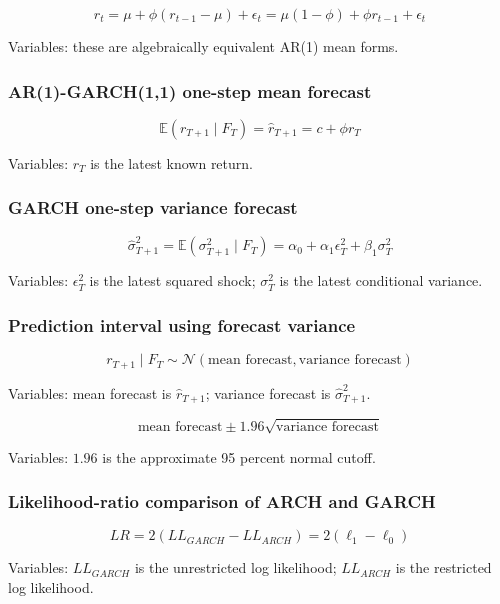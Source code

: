 \documentclass[
  8pt,
  twocolumn]{extarticle}
\begin{document}
\[
r_t=\mu+\phi(r_{t-1}-\mu)+\epsilon_t=\mu(1-\phi)+\phi r_{t-1}+\epsilon_t
\]

Variables: these are algebraically equivalent AR(1) mean forms.

\subsubsection{AR(1)-GARCH(1,1) one-step mean
forecast}\label{ar1-garch11-one-step-mean-forecast}

\[
\mathbb E(r_{T+1}\mid F_T)=\hat r_{T+1}=c+\phi r_T
\]

Variables: \(r_T\) is the latest known return.

\subsubsection{GARCH one-step variance
forecast}\label{garch-one-step-variance-forecast}

\[
\hat\sigma_{T+1}^2=\mathbb E(\sigma_{T+1}^2\mid F_T)=\alpha_0+\alpha_1\epsilon_T^2+\beta_1\sigma_T^2
\]

Variables: \(\epsilon_T^2\) is the latest squared shock; \(\sigma_T^2\)
is the latest conditional variance.

\subsubsection{Prediction interval using forecast
variance}\label{prediction-interval-using-forecast-variance}

\[
r_{T+1}\mid F_T\sim\mathcal N(\text{mean forecast},\text{variance forecast})
\]

Variables: mean forecast is \(\hat r_{T+1}\); variance forecast is
\(\hat\sigma_{T+1}^2\).

\[
\text{mean forecast}\pm1.96\sqrt{\text{variance forecast}}
\]

Variables: \(1.96\) is the approximate 95 percent normal cutoff.

\subsubsection{Likelihood-ratio comparison of ARCH and
GARCH}\label{likelihood-ratio-comparison-of-arch-and-garch}

\[
LR=2(LL_{GARCH}-LL_{ARCH})=2(\ell_1-\ell_0)
\]

Variables: \(LL_{GARCH}\) is the unrestricted log likelihood;
\(LL_{ARCH}\) is the restricted log likelihood.
\end{document}

